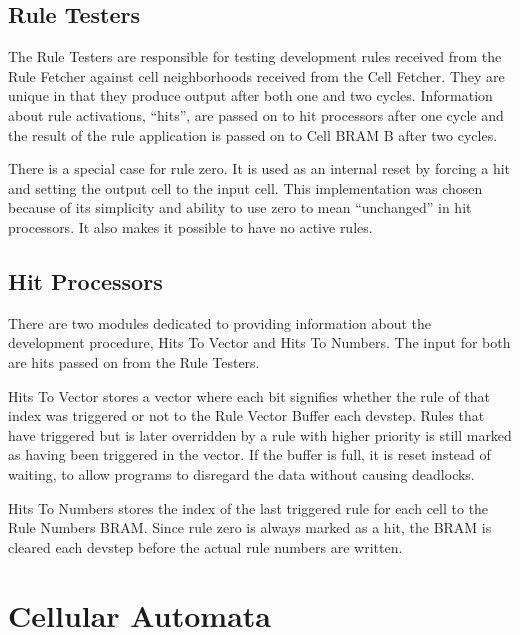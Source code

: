 \subsection{Rule Testers}

The Rule Testers are responsible for testing development rules received from the Rule Fetcher against cell neighborhoods received from the Cell Fetcher.
They are unique in that they produce output after both one and two cycles.
Information about rule activations, ``hits'', are passed on to hit processors after one cycle and the result of the rule application is passed on to Cell BRAM B after two cycles.

There is a special case for rule zero.
It is used as an internal reset by forcing a hit and setting the output cell to the input cell.
This implementation was chosen because of its simplicity and ability to use zero to mean ``unchanged'' in hit processors.
It also makes it possible to have no active rules.

\subsection{Hit Processors}

There are two modules dedicated to providing information about the development procedure, Hits To Vector and Hits To Numbers.
The input for both are hits passed on from the Rule Testers.

Hits To Vector stores a vector where each bit signifies whether the rule of that index was triggered or not to the Rule Vector Buffer each devstep.
Rules that have triggered but is later overridden by a rule with higher priority is still marked as having been triggered in the vector.
If the buffer is full, it is reset instead of waiting, to allow programs to disregard the data without causing deadlocks.

Hits To Numbers stores the index of the last triggered rule for each cell to the Rule Numbers BRAM.
Since rule zero is always marked as a hit, the BRAM is cleared each devstep before the actual rule numbers are written.


\section{Cellular Automata}

